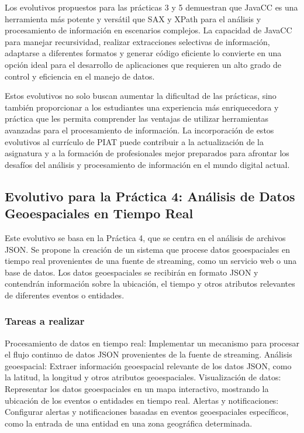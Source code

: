 
Los evolutivos propuestos para las prácticas 3 y 5 demuestran que JavaCC es una herramienta más potente y versátil que SAX y XPath para el análisis y procesamiento de información en escenarios complejos. La capacidad de JavaCC para manejar recursividad, realizar extracciones selectivas de información, adaptarse a diferentes formatos y generar código eficiente lo convierte en una opción ideal para el desarrollo de aplicaciones que requieren un alto grado de control y eficiencia en el manejo de datos.

Estos evolutivos no solo buscan aumentar la dificultad de las prácticas, sino también proporcionar a los estudiantes una experiencia más enriquecedora y práctica que les permita comprender las ventajas de utilizar herramientas avanzadas para el procesamiento de información. La incorporación de estos evolutivos al currículo de PIAT puede contribuir a la actualización de la asignatura y a la formación de profesionales mejor preparados para afrontar los desafíos del análisis y procesamiento de información en el mundo digital actual.


\subsection{Evolutivo para la Práctica 4: Análisis de Datos Geoespaciales en Tiempo Real}

Este evolutivo se basa en la Práctica 4, que se centra en el análisis de archivos JSON. Se propone la creación de un sistema que procese datos geoespaciales en tiempo real provenientes de una fuente de streaming, como un servicio web o una base de datos. Los datos geoespaciales se recibirán en formato JSON y contendrán información sobre la ubicación, el tiempo y otros atributos relevantes de diferentes eventos o entidades.

\subsubsection{Tareas a realizar}

Procesamiento de datos en tiempo real: Implementar un mecanismo para procesar el flujo continuo de datos JSON provenientes de la fuente de streaming.
Análisis geoespacial: Extraer información geoespacial relevante de los datos JSON, como la latitud, la longitud y otros atributos geoespaciales.
Visualización de datos: Representar los datos geoespaciales en un mapa interactivo, mostrando la ubicación de los eventos o entidades en tiempo real.
Alertas y notificaciones: Configurar alertas y notificaciones basadas en eventos geoespaciales específicos, como la entrada de una entidad en una zona geográfica determinada.
